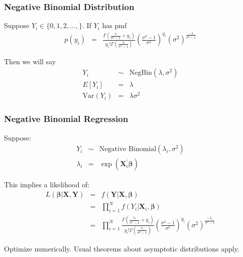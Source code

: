 \documentclass{beamer}
\begin{document}
\begin{frame}
\frametitle{Negative Binomial Distribution}

Suppose $Y_{i} \in \{0, 1, 2, \hdots, \}$.  If $Y_{i}$ has pmf
\begin{eqnarray}
p(y_{i}) & = & \frac{\Gamma\left(\frac{\lambda}{\sigma^2 -1} + y_{i} \right)}{y_{i}! \Gamma\left(\frac{\lambda}{\sigma^2 -1}  \right) } \left(\frac{\sigma^2 - 1}{\sigma^2}\right)^{y_{i}} \left(\sigma^2\right)^{\frac{-\lambda}{\sigma^2 - 1}} \nonumber
\end{eqnarray}

Then we will say
\begin{eqnarray}
Y_{i} & \sim & \text{NegBin}(\lambda, \sigma^2)\nonumber \\
E[Y_{i}] &= & \lambda \nonumber \\
\text{Var}(Y_{i}) & = & \lambda \sigma^2 \nonumber
\end{eqnarray}


\end{frame}

\begin{frame}
\frametitle{Negative Binomial Regression}
Suppose:
\begin{eqnarray}
Y_{i} & \sim & \text{Negative Binomial}(\lambda_{i}, \sigma^2)\nonumber \\
\lambda_{i} & = & \exp(\boldsymbol{X}_{i}^{'}\boldsymbol{\beta}) \nonumber
\end{eqnarray}

This implies a likelihood of:
\begin{eqnarray}
L(\boldsymbol{\beta}|\boldsymbol{X}, \boldsymbol{Y}) & = & f(\boldsymbol{Y}| \boldsymbol{X}, \boldsymbol{\beta}) \nonumber \\
& = & \prod_{i=1}^{N} f(Y_{i}| \boldsymbol{X}_{i}, \boldsymbol{\beta}) \nonumber \\
& = & \prod_{i=1}^{N} \frac{\Gamma\left(\frac{\lambda_{i}}{\sigma^2 -1} + y_{i} \right)}{y_{i}! \Gamma\left(\frac{\lambda_{i} }{\sigma^2 -1}  \right) } \left(\frac{\sigma^2 - 1}{\sigma^2}\right)^{y_{i}} \left(\sigma^2\right)^{\frac{-\lambda_{i}}{\sigma^2 - 1}} \nonumber
\end{eqnarray}

Optimize numerically.  Usual theorems about asymptotic distributions apply.
\end{frame}
\end{document}
